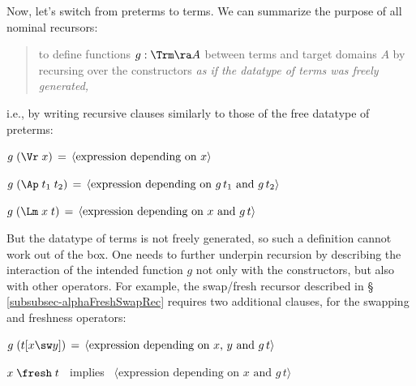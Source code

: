 \vspace*{0.5ex}
Now, let's switch from preterms to terms. 
%
We can summarize the purpose of all nominal recursors:  
\begin{quote} 
	\vspace*{-1ex}
to %
define functions 
$g : \Trm \ra A$ between terms and target domains $A$ 
by recursing over the %
constructors 
\emph{as if the datatype of terms was %
	freely generated,} 
\end{quote} 
\vspace*{-1ex}
%
i.e., by writing recursive clauses similarly to
those of the 
free datatype of preterms:
%
\begin{mmyitem}
	\item %
	$g\;(\Vr\;x) \,=\, \langle \mbox{expression depending on $x$}\rangle$ 
	\item %
	$g\;(\Ap\;t_1\;t_2) \,=\, \langle \mbox{expression depending on $g\,t_1$ and $g\,t_2$}\rangle$
	\item %
	$g\;(\Lm\;x\;t) \,=\, \langle \mbox{expression depending on $x$ and $g\,t$}\rangle$
\end{mmyitem}
%

But the datatype of terms is not freely generated, so %
such a definition cannot work out of the box. 
%
One needs to further underpin recursion by describing the interaction of the intended function $g$ not only with the constructors, but also with other operators.  
For example, the swap/fresh recursor described in \S%
\ref{subsubsec-alphaFreshSwapRec} requires two additional clauses, for the swapping and freshness operators:  
\begin{mmyitem}
	\item %
	$g\;(t[x\sw y]) \,=\, \langle \mbox{expression depending on $x$, $y$  and $g\,t$}\rangle$
	\item %
	$x \;\fresh\;t$ \ implies \ $\langle \mbox{expression depending on $x$ and $g\,t$}\rangle$
\end{mmyitem}
%

